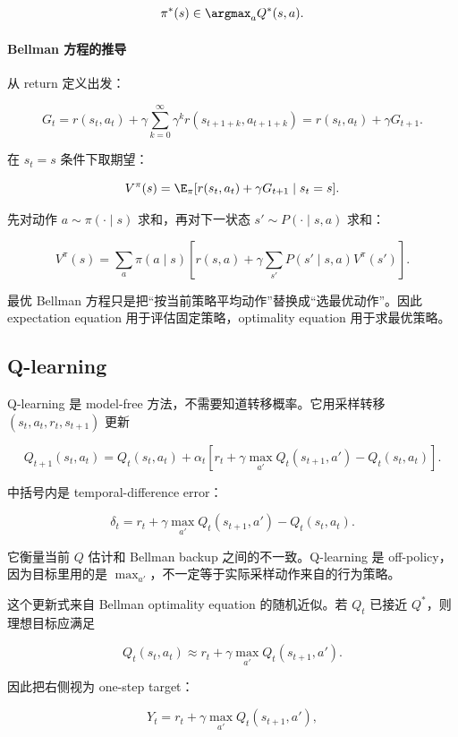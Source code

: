 \[
  \pi^*(s)\in\argmax_a Q^*(s,a).
\]

\paragraph{Bellman 方程的推导}

从 return 定义出发：

\[
  G_t
  =
  r(s_t,a_t)
  +
  \gamma
  \sum_{k=0}^{\infty}\gamma^k r(s_{t+1+k},a_{t+1+k})
  =
  r(s_t,a_t)+\gamma G_{t+1}.
\]

在 \(s_t=s\) 条件下取期望：

\[
  V^\pi(s)
  =
  \E_\pi[r(s_t,a_t)+\gamma G_{t+1}\mid s_t=s].
\]

先对动作 \(a\sim\pi(\cdot\mid s)\) 求和，再对下一状态 \(s'\sim P(\cdot\mid s,a)\) 求和：

\[
  V^\pi(s)
  =
  \sum_a\pi(a\mid s)
  \left[
    r(s,a)
    +
    \gamma\sum_{s'}P(s'\mid s,a)V^\pi(s')
  \right].
\]

最优 Bellman 方程只是把“按当前策略平均动作”替换成“选最优动作”。因此 expectation equation 用于评估固定策略，optimality equation 用于求最优策略。

\subsection{Q-learning}


Q-learning 是 model-free 方法，不需要知道转移概率。它用采样转移 \((s_t,a_t,r_t,s_{t+1})\) 更新

\[
  Q_{t+1}(s_t,a_t)
  =
  Q_t(s_t,a_t)
  +
  \alpha_t
  \left[
    r_t
    +
    \gamma\max_{a'}Q_t(s_{t+1},a')
    -
    Q_t(s_t,a_t)
  \right].
\]

中括号内是 temporal-difference error：

\[
  \delta_t
  =
  r_t
  +
  \gamma\max_{a'}Q_t(s_{t+1},a')
  -
  Q_t(s_t,a_t).
\]

它衡量当前 \(Q\) 估计和 Bellman backup 之间的不一致。Q-learning 是 off-policy，因为目标里用的是 \(\max_{a'}\)，不一定等于实际采样动作来自的行为策略。

这个更新式来自 Bellman optimality equation 的随机近似。若 \(Q_t\) 已接近 \(Q^*\)，则理想目标应满足

\[
  Q_t(s_t,a_t)
  \approx
  r_t+\gamma\max_{a'}Q_t(s_{t+1},a').
\]

因此把右侧视为 one-step target：

\[
  Y_t=r_t+\gamma\max_{a'}Q_t(s_{t+1},a'),
\]

